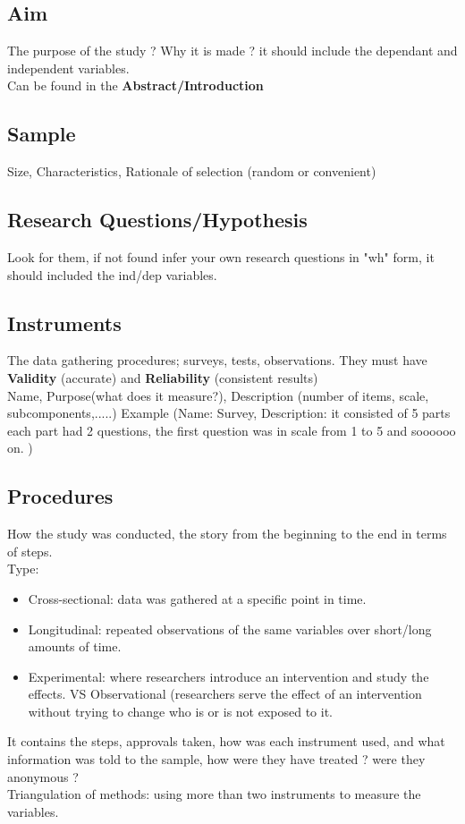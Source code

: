 \documentclass[11pt]{article}
\begin{document}
\subsection{Aim}
The purpose of the study ? Why it is made ?
it should include the dependant and independent variables.\\
Can be found in the \textbf{Abstract/Introduction} 
\subsection{Sample}
Size, Characteristics, Rationale of selection (random or convenient) 
\subsection{Research Questions/Hypothesis}
Look for them, if not found infer your own research questions in "wh" form, it should included the ind/dep variables. 
\subsection{Instruments}
The data gathering procedures; surveys, tests, observations. They must have \textbf{Validity} (accurate) and \textbf{Reliability} (consistent results)
\\
Name, Purpose(what does it measure?), Description (number of items, scale, subcomponents,.....)
Example (Name: Survey, Description: it consisted of 5 parts each part had 2 questions, the first question was in scale from 1 to 5 and soooooo on. )

\subsection{Procedures}
How the study was conducted, the story from the beginning to the end in terms of steps.\\
Type: \begin{itemize}

\item Cross-sectional: data was gathered at a specific point in time.
\item Longitudinal: repeated observations of the same variables over short/long amounts of time.
\item Experimental: where researchers introduce an intervention and study the effects. VS Observational (researchers serve the effect of an intervention without trying to change who is or is not exposed to it.
\end{itemize}
It contains the steps, approvals taken, how was each instrument used, and what information was told to the sample, how were they have treated ? were they anonymous ?
\\ Triangulation of methods: using more than two instruments to measure the variables.
\end{document}

